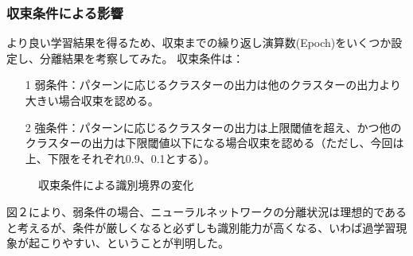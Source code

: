 \documentclass[ %
  uplatex,%
  papersize%
]{jsarticle}
\begin{document}
\subsubsection{収束条件による影響}
より良い学習結果を得るため、収束までの繰り返し演算数(Epoch)をいくつか設定し、分離結果を考察してみた。
収束条件は：
\begin{itemize}
\item[1]弱条件：パターンに応じるクラスターの出力は他のクラスターの出力より大きい場合収束を認める。
\item[2]強条件：パターンに応じるクラスターの出力は上限閾値を超え、かつ他のクラスターの出力は下限閾値以下になる場合収束を認める（ただし、今回は上、下限をそれぞれ0.9、0.1とする）。
\end{itemize}
\begin{figure}[!h]
\centering
{}
\caption{収束条件による識別境界の変化} 
\end{figure}
図２により、弱条件の場合、ニューラルネットワークの分離状況は理想的であると考えるが、条件が厳しくなると必ずしも識別能力が高くなる、いわば過学習現象\cite{DL}が起こりやすい、ということが判明した。
\end{document}
